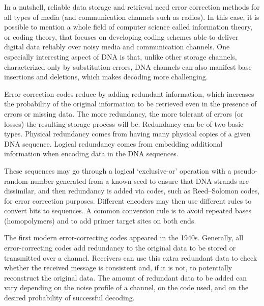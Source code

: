 \documentclass[10pt,twocolumn,twoside]{gsajnl}
\begin{document}
In a nutshell, reliable data storage and retrieval need error correction methods for all types of media (and communication channels such as radios). In this case, it is possible to mention a whole field of computer science called information theory, or coding theory, that focuses on developing coding schemes able to deliver digital data reliably over noisy media and communication channels. One especially interesting aspect of DNA is that, unlike other storage channels, characterized only by substitution errors, DNA channels can also manifest base insertions and deletions, which makes decoding more challenging.\

Error correction codes reduce by adding redundant information, which increases the probability of the original information to be retrieved even in the presence of errors or missing data. The more redundancy, the more tolerant of errors (or losses) the resulting storage process will be. Redundancy can be of two basic types. Physical redundancy comes from having many physical copies of a given DNA sequence. Logical redundancy comes from embedding additional information when encoding data in the DNA sequences.

These sequences may go through a logical ‘exclusive-or’ operation with a pseudo-random number generated from a known seed to ensure that DNA strands are dissimilar, and then redundancy is added via codes, such as Reed–Solomon codes, for error correction purposes. Different encoders may then use different rules to convert bits to sequences. A common conversion rule is to avoid repeated bases (homopolymers) and to add primer target sites on both ends.

The first modern error-correcting codes appeared in the 1940s. Generally, all error-correcting codes add redundancy to the original data to be stored or transmitted over a channel. Receivers can use this extra redundant data to check whether the received message is consistent and, if it is not, to potentially reconstruct the original data. The amount of redundant data to be added can vary depending on the noise profile of a channel, on the code used, and on the desired probability of successful decoding.




\end{document}
